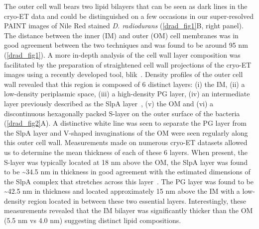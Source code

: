 The outer cell wall bears two lipid bilayers that can be seen as dark lines in the cryo-ET data and could be distinguished on a few occasions in our super-resolved PAINT images of Nile Red stained \textit{D. radiodurans} (\autoref{drad_fig1}B, right panel).
The distance between the inner (IM) and outer (OM) cell membranes was in good agreement between the two techniques and was found to be around 95 nm (\autoref{drad_fig1}).
A more in-depth analysis of the cell wall layer composition was facilitated by the preparation of straightened cell wall projections of the cryo-ET images using a recently developed tool, blik~\cite{gaifasBlikExtensible3D2024}.
Density profiles of the outer cell wall revealed that this region is composed of 6 distinct layers: (i) the IM, (ii) a low-density periplasmic space, (iii) a high-density PG layer, (iv) an intermediate layer previously described as the SlpA layer~\cite{vonkugelgenMultidomainConnectorLinks2022}, (v) the OM and (vi) a discontinuous hexagonally packed S-layer on the outer surface of the bacteria (\autoref{drad_fig2}A).
A distinctive white line was seen to separate the PG layer from the SlpA layer and V-shaped invaginations of the OM were seen regularly along this outer cell wall.
Measurements made on numerous cryo-ET datasets allowed us to determine the mean thickness of each of these 6 layers.
When present, the S-layer was typically located at 18 nm above the OM, the SlpA layer was found to be \sim34.5 nm in thickness in good agreement with the estimated dimensions of the SlpA complex that stretches across this layer~\cite{vonkugelgenMultidomainConnectorLinks2022}.
The PG layer was found to be \sim42.5 nm in thickness and located approximately 15 nm above the IM with a low-density region located in between these two essential layers.
Interestingly, these measurements revealed that the IM bilayer was significantly thicker than the OM (5.5 nm vs 4.0 nm) suggesting distinct lipid compositions.

